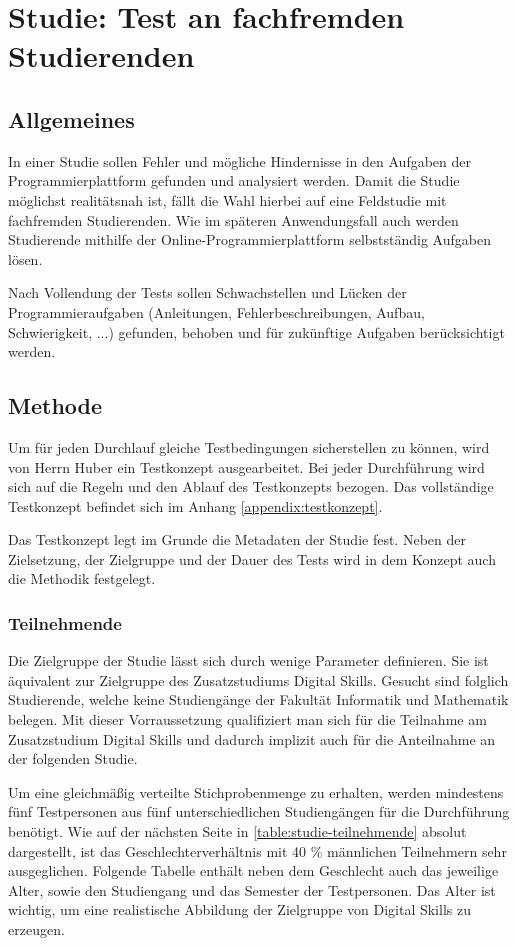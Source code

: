 \section{Studie: Test an fachfremden Studierenden}\label{studie}
\subsection{Allgemeines}
In einer Studie sollen Fehler und mögliche Hindernisse in den Aufgaben der
Programmierplattform gefunden und analysiert werden. Damit die Studie möglichst
realitätsnah ist, fällt die Wahl hierbei auf eine Feldstudie mit fachfremden
Studierenden. Wie im späteren Anwendungsfall auch werden Studierende mithilfe
der Online-Programmierplattform selbstständig Aufgaben lösen.
\parencite{feldstudie}

Nach Vollendung der Tests sollen Schwachstellen und Lücken der
Programmieraufgaben (Anleitungen, Fehlerbeschreibungen, Aufbau, Schwierigkeit,
...) gefunden, behoben und für zukünftige Aufgaben berücksichtigt werden.

\subsection{Methode}
Um für jeden Durchlauf gleiche Testbedingungen sicherstellen zu können, wird von
Herrn Huber ein Testkonzept ausgearbeitet. Bei jeder Durchführung wird sich auf
die Regeln und den Ablauf des Testkonzepts bezogen. Das vollständige Testkonzept
befindet sich im Anhang \ref{appendix:testkonzept}.

Das Testkonzept legt im Grunde die Metadaten der Studie fest. Neben der
Zielsetzung, der Zielgruppe und der Dauer des Tests wird in dem Konzept auch die
Methodik festgelegt.

\subsubsection{Teilnehmende}
Die Zielgruppe der Studie lässt sich durch wenige Parameter definieren. Sie
ist äquivalent zur Zielgruppe des Zusatzstudiums Digital Skills. Gesucht sind
folglich Studierende, welche keine Studiengänge der Fakultät Informatik und
Mathematik belegen. Mit dieser Vorraussetzung qualifiziert man sich für die
Teilnahme am Zusatzstudium Digital Skills und dadurch implizit auch für die
Anteilnahme an der folgenden Studie.

Um eine gleichmäßig verteilte Stichprobenmenge zu erhalten, werden mindestens
fünf Testpersonen aus fünf unterschiedlichen Studiengängen für die Durchführung
benötigt. Wie auf der nächsten Seite in \autoref{table:studie-teilnehmende}
absolut dargestellt, ist das Geschlechterverhältnis mit 40 \% männlichen
Teilnehmern sehr ausgeglichen. Folgende Tabelle enthält neben dem Geschlecht
auch das jeweilige Alter, sowie den Studiengang und das Semester der
Testpersonen. Das Alter ist wichtig, um eine realistische Abbildung der
Zielgruppe von Digital Skills zu erzeugen.

